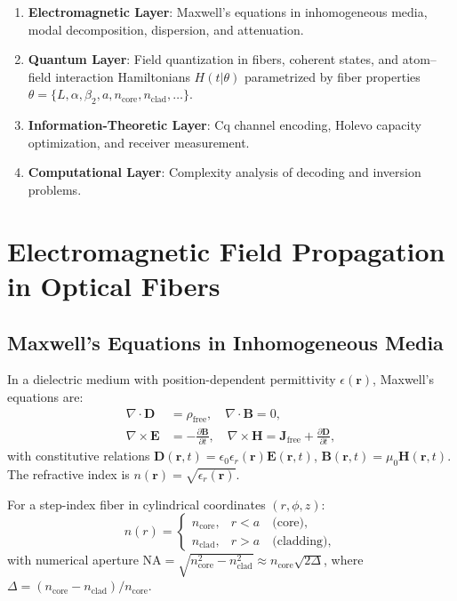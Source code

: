 \documentclass[12pt]{article}
\begin{document}
\begin{enumerate}
    \item \textbf{Electromagnetic Layer}: Maxwell's equations in inhomogeneous media, modal decomposition, dispersion, and attenuation.
    \item \textbf{Quantum Layer}: Field quantization in fibers, coherent states, and atom--field interaction Hamiltonians $H(t|\theta)$ parametrized by fiber properties $\theta = \{L, \alpha, \beta_2, a, n_{\text{core}}, n_{\text{clad}}, \dots\}$.
    \item \textbf{Information-Theoretic Layer}: Cq channel encoding, Holevo capacity optimization, and receiver measurement.
    \item \textbf{Computational Layer}: Complexity analysis of decoding and inversion problems.
\end{enumerate}

\section{Electromagnetic Field Propagation in Optical Fibers}
\subsection{Maxwell's Equations in Inhomogeneous Media}
In a dielectric medium with position-dependent permittivity $\epsilon(\mathbf{r})$, Maxwell's equations are:
\begin{align}
    \nabla \cdot \mathbf{D} &= \rho_{\text{free}}, \quad \nabla \cdot \mathbf{B} = 0, \\
    \nabla \times \mathbf{E} &= -\frac{\partial \mathbf{B}}{\partial t}, \quad \nabla \times \mathbf{H} = \mathbf{J}_{\text{free}} + \frac{\partial \mathbf{D}}{\partial t},
\end{align}
with constitutive relations $\mathbf{D}(\mathbf{r},t) = \epsilon_0 \epsilon_r(\mathbf{r}) \mathbf{E}(\mathbf{r},t)$, $\mathbf{B}(\mathbf{r},t) = \mu_0 \mathbf{H}(\mathbf{r},t)$. The refractive index is $n(\mathbf{r}) = \sqrt{\epsilon_r(\mathbf{r})}$.

For a step-index fiber in cylindrical coordinates $(r,\phi,z)$:
\begin{equation}
    n(r) = 
    \begin{cases}
        n_{\text{core}}, & r < a \quad \text{(core)}, \\
        n_{\text{clad}}, & r > a \quad \text{(cladding)},
    \end{cases}
\end{equation}
with numerical aperture $\mathrm{NA} = \sqrt{n_{\text{core}}^2 - n_{\text{clad}}^2} \approx n_{\text{core}}\sqrt{2\Delta}$, where $\Delta = (n_{\text{core}} - n_{\text{clad}})/n_{\text{core}}$.
\end{document}
